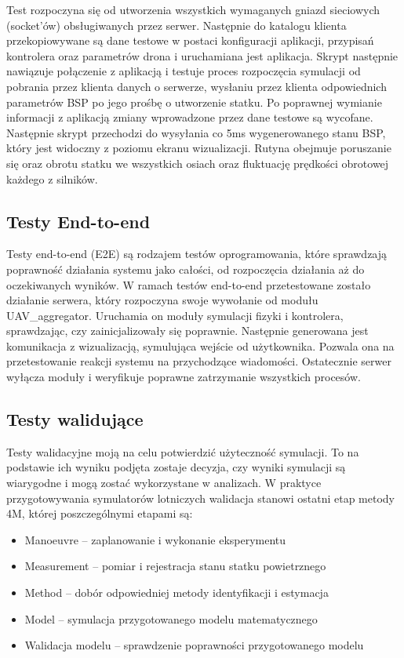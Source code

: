Test rozpoczyna się od utworzenia wszystkich wymaganych gniazd sieciowych (socket'ów) obsługiwanych przez serwer. Następnie do katalogu klienta przekopiowywane są dane testowe w postaci konfiguracji aplikacji, przypisań kontrolera oraz parametrów drona i uruchamiana jest aplikacja. Skrypt następnie nawiązuje połączenie z aplikacją i testuje proces rozpoczęcia symulacji od pobrania przez klienta danych o serwerze, wysłaniu przez klienta odpowiednich parametrów BSP po jego prośbę o utworzenie statku. Po poprawnej wymianie informacji z aplikacją zmiany wprowadzone przez dane testowe są wycofane. Następnie skrypt przechodzi do wysyłania co 5ms wygenerowanego stanu BSP, który jest widoczny z poziomu ekranu wizualizacji. Rutyna obejmuje poruszanie się oraz obrotu statku we wszystkich osiach oraz fluktuację prędkości obrotowej każdego z silników.  

\subsection{Testy End-to-end}

Testy end-to-end (E2E) są rodzajem testów oprogramowania, które sprawdzają poprawność działania systemu jako całości, od rozpoczęcia działania aż do oczekiwanych wyników. W ramach testów end-to-end przetestowane zostało działanie serwera, który rozpoczyna swoje wywołanie od modułu UAV\_aggregator. Uruchamia on moduły symulacji fizyki i kontrolera, sprawdzając, czy zainicjalizowały się poprawnie. 
Następnie generowana jest komunikacja z wizualizacją, symulująca wejście od użytkownika. Pozwala ona na przetestowanie reakcji systemu na przychodzące wiadomości.
Ostatecznie serwer wyłącza moduły i weryfikuje poprawne zatrzymanie wszystkich procesów. 

\subsection{Testy walidujące}

Testy walidacyjne moją na celu potwierdzić użyteczność symulacji. To na podstawie ich wyniku podjęta zostaje decyzja, czy wyniki symulacji są wiarygodne i mogą zostać wykorzystane w analizach. W praktyce przygotowywania symulatorów lotniczych walidacja stanowi ostatni etap metody 4M, której poszczególnymi etapami są:
\begin{itemize}[noitemsep]
\item Manoeuvre -- zaplanowanie i wykonanie eksperymentu
\item Measurement -- pomiar i rejestracja stanu statku powietrznego
\item Method -- dobór odpowiedniej metody identyfikacji i estymacja
\item Model -- symulacja przygotowanego modelu matematycznego
\item Walidacja modelu -- sprawdzenie poprawności przygotowanego modelu
\end{itemize}

